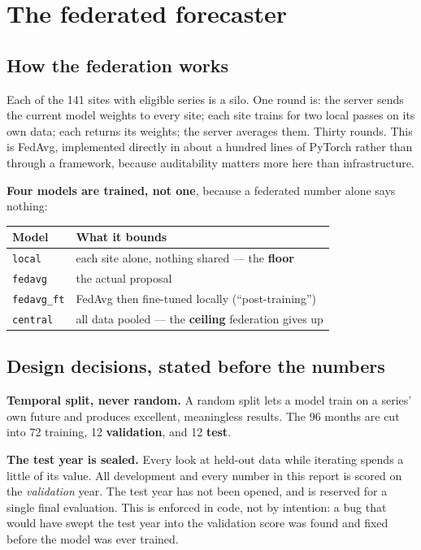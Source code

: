 \documentclass[11pt,a4paper]{article}
\newcommand{\keypoint}[1]{%
  \par\vspace{0.4em}%
  \noindent\colorbox{fed!8}{\parbox{0.98\textwidth}{\vspace{0.2em}#1\vspace{0.2em}}}%
  \par\vspace{0.4em}}
\begin{document}
\section{The federated forecaster}
\label{sec:forecaster}

\subsection{How the federation works}

Each of the 141 sites with eligible series is a silo. One round is: the server sends the current model
weights to every site; each site trains for two local passes on its own data; each returns its weights;
the server averages them. Thirty rounds. This is FedAvg, implemented directly in about a hundred lines
of PyTorch rather than through a framework, because auditability matters more here than infrastructure.

\textbf{Four models are trained, not one}, because a federated number alone says nothing:

\begin{center}
\begin{tabular}{@{}lp{9.5cm}@{}}
\toprule
\textbf{Model} & \textbf{What it bounds} \\
\midrule
\texttt{local} & each site alone, nothing shared --- the \textbf{floor} \\
\texttt{fedavg} & the actual proposal \\
\texttt{fedavg\_ft} & FedAvg then fine-tuned locally (``post-training'') \\
\texttt{central} & all data pooled --- the \textbf{ceiling} federation gives up \\
\bottomrule
\end{tabular}
\end{center}

\subsection{Design decisions, stated before the numbers}

\textbf{Temporal split, never random.} A random split lets a model train on a series' own future and
produces excellent, meaningless results. The 96 months are cut into 72 training, 12
\textbf{validation}, and 12 \textbf{test}.

\keypoint{\textbf{The test year is sealed.} Every look at held-out data while iterating spends a little
of its value. All development and every number in this report is scored on the \emph{validation} year.
The test year has not been opened, and is reserved for a single final evaluation. This is enforced in
code, not by intention: a bug that would have swept the test year into the validation score was found
and fixed before the model was ever trained.}
\end{document}
